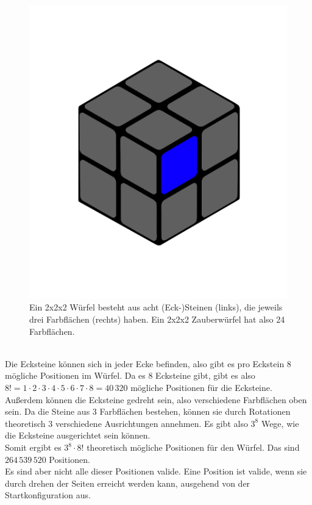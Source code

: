 \documentclass[12pt,a4paper, usenames, dvipsnames]{article}
\begin{document}
\begin{figure}[h]
\includegraphics[scale=0.1]{2x2farbflaeche.png}
\caption{Ein 2x2x2 Würfel besteht aus acht (Eck-)Steinen (links), die jeweils drei Farbflächen (rechts) haben. Ein 2x2x2 Zauberwürfel hat also 24 Farbflächen.}
\end{figure} 
$\ $ \\
Die Ecksteine können sich in jeder Ecke befinden, also gibt es pro Eckstein 8 mögliche Positionen im Würfel. Da es 8 Ecksteine gibt, gibt es also $8! = 1 \cdot 2 \cdot 3 \cdot 4 \cdot 5 \cdot 6 \cdot 7 \cdot 8 = 40\, 320$ mögliche Positionen für die Ecksteine. \\
Außerdem können die Ecksteine gedreht sein, also verschiedene Farbflächen oben sein. Da die Steine aus 3 Farbflächen bestehen, können sie durch Rotationen theoretisch 3 verschiedene Ausrichtungen annehmen. Es gibt also $3^8$ Wege, wie die Ecksteine ausgerichtet sein können. \\
Somit ergibt es $3^8 \cdot 8!$ theoretisch mögliche Positionen für den Würfel. Das sind $264\, 539\, 520$ Positionen.\\
Es sind aber nicht alle dieser Positionen valide. Eine Position ist valide, wenn sie durch drehen der Seiten erreicht werden kann, ausgehend von der Startkonfiguration aus. \\
\end{document}
